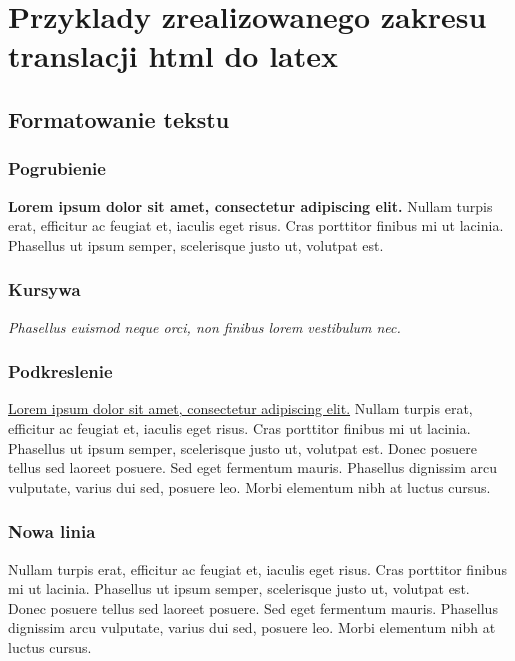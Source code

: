 \documentclass{report}
\begin{document}
    \chapter{Przyklady zrealizowanego zakresu translacji html do latex}

    \section{Formatowanie tekstu}
        \subsection{Pogrubienie}
            \textbf{Lorem ipsum dolor sit amet, consectetur adipiscing elit.}
            Nullam turpis erat, efficitur ac feugiat et, iaculis eget
            risus. Cras porttitor finibus mi ut lacinia. Phasellus ut
            ipsum semper, scelerisque justo ut, volutpat est.

        \subsection{Kursywa}
            \textit{Phasellus euismod neque orci, non finibus lorem vestibulum nec.}

        \subsection{Podkreslenie}
            \underline{Lorem ipsum dolor sit amet, consectetur adipiscing elit.}
            Nullam turpis erat, efficitur ac feugiat et, iaculis eget
            risus. Cras porttitor finibus mi ut lacinia. Phasellus ut
            ipsum semper, scelerisque justo ut, volutpat est. Donec posuere
            tellus sed laoreet posuere. Sed eget fermentum mauris. Phasellus
            dignissim arcu vulputate, varius dui sed, posuere leo. Morbi
            elementum nibh at luctus cursus.

        \subsection{Nowa linia}
            Nullam turpis erat, efficitur ac feugiat et, iaculis eget
            risus. Cras porttitor finibus mi ut lacinia. Phasellus ut
            ipsum semper, scelerisque justo ut, volutpat est. \newline Donec posuere
            tellus sed laoreet posuere. Sed eget fermentum mauris. Phasellus
            dignissim arcu vulputate, varius dui sed, posuere leo. Morbi
            elementum nibh at luctus cursus.
\end{document}
